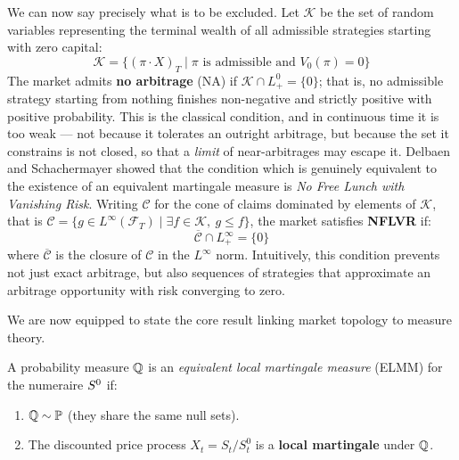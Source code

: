 We can now say precisely what is to be excluded. Let $\mathcal{K}$ be the set of random variables representing the terminal wealth of all admissible strategies starting with zero capital:
\begin{equation}
    \mathcal{K} = \{ (\pi \cdot X)_T \mid \pi \text{ is admissible and } V_0(\pi) = 0 \}
\end{equation}
The market admits \textbf{no arbitrage} (NA) if $\mathcal{K}\cap L^{0}_{+} = \{0\}$; that is, no admissible strategy starting from nothing finishes non-negative and strictly positive with positive probability. This is the classical condition, and in continuous time it is too weak --- not because it tolerates an outright arbitrage, but because the set it constrains is not closed, so that a \emph{limit} of near-arbitrages may escape it. Delbaen and Schachermayer \cite{delbaenschachermayer1994} showed that the condition which is genuinely equivalent to the existence of an equivalent martingale measure is \textit{No Free Lunch with Vanishing Risk}. Writing $\mathcal{C}$ for the cone of claims dominated by elements of $\mathcal{K}$, that is $\mathcal{C} = \{ g \in L^\infty(\mathcal{F}_T) \mid \exists f \in \mathcal{K},\ g \le f \}$, the market satisfies \textbf{NFLVR} if:
\begin{equation}
    \overline{\mathcal{C}} \cap L_+^\infty = \{0\}
\end{equation}
where $\overline{\mathcal{C}}$ is the closure of $\mathcal{C}$ in the $L^\infty$ norm. Intuitively, this condition prevents not just exact arbitrage, but also sequences of strategies that approximate an arbitrage opportunity with risk converging to zero.

\vspace{0.2cm}

We are now equipped to state the core result linking market topology to measure theory.

\begin{definition}
A probability measure $\mathbb{Q}$ is an \emph{equivalent local martingale measure} (ELMM) for the
numeraire $S^{0}$ if:
\begin{enumerate}
    \item $\mathbb{Q} \sim \mathbb{P}$ (they share the same null sets).
    \item The discounted price process $X_t = S_t / S^0_t$ is a \textbf{local martingale} under $\mathbb{Q}$.
\end{enumerate}
\end{definition}


